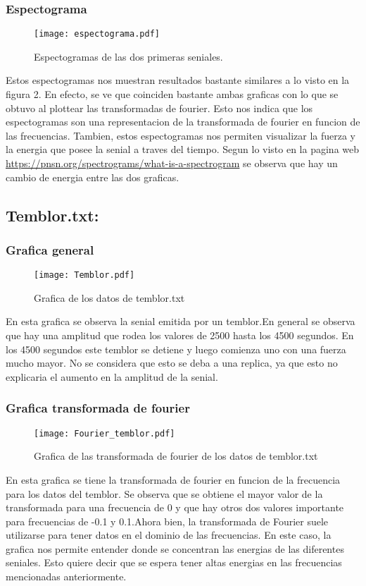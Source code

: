 \documentclass[11pt,letterpaper]{exam}
\begin{document}
\subsubsection{Espectograma}
\begin{figure}[H]
    \centering
    \texttt{[image: espectograma.pdf]}
    \caption{Espectogramas de las dos primeras seniales.}
    \label{fig:my_label}
\end{figure}
Estos espectogramas nos muestran resultados bastante similares a lo visto en la figura 2. En efecto, se ve que coinciden bastante ambas graficas con lo que se obtuvo al plottear las transformadas de fourier. Esto nos indica que los espectogramas son una representacion de la transformada de fourier en funcion de las frecuencias. Tambien, estos espectogramas nos permiten visualizar la fuerza y la energia que posee la senial a traves del tiempo. Segun lo visto en la pagina web \url{https://pnsn.org/spectrograms/what-is-a-spectrogram} se observa que hay un cambio de energia entre las dos graficas. 
\subsection{Temblor.txt:}
\subsubsection{Grafica general}
\begin{figure}[H]
    \centering
    \texttt{[image: Temblor.pdf]}
    \caption{Grafica de los datos de temblor.txt}
    \label{fig:my_label}
\end{figure}
En esta grafica se observa la senial emitida por un temblor.En general se observa que hay una amplitud que rodea los valores de 2500 hasta los 4500 segundos. En los 4500 segundos este temblor se detiene y luego comienza uno con una fuerza mucho mayor. No se considera que esto se deba a una replica, ya que esto no explicaria el aumento en la amplitud de la senial. 
\subsubsection{Grafica transformada de fourier}
\begin{figure}[H]
    \centering
    \texttt{[image: Fourier\_temblor.pdf]}
    \caption{Grafica de las transformada de fourier de los datos de temblor.txt}
    \label{fig:my_label}

\end{figure}
En esta grafica se tiene la transformada de fourier en funcion de la frecuencia para los datos del temblor. Se observa que se obtiene el mayor valor de la transformada para una frecuencia de 0 y que hay otros dos valores importante para frecuencias de -0.1 y 0.1.Ahora bien, la transformada de Fourier suele utilizarse para tener datos en el dominio de las frecuencias. En este caso, la grafica nos permite entender donde se concentran las energias de las diferentes seniales.   Esto quiere decir que se espera tener altas energias en las frecuencias mencionadas anteriormente.
\end{document}
